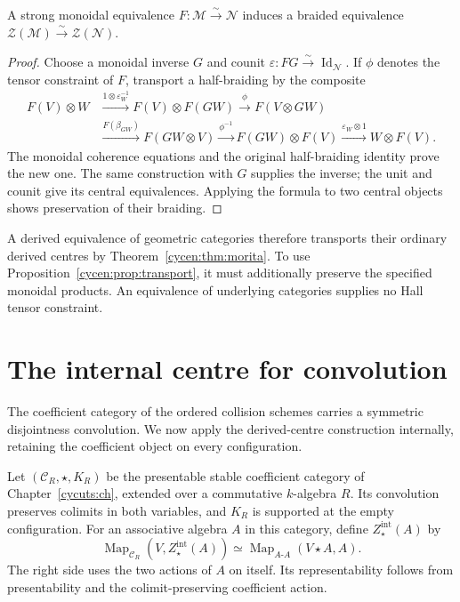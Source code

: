 \begin{proposition}\label{cycen:prop:transport}
A strong monoidal equivalence
$F:\mathscr M\xrightarrow{\sim}\mathscr N$ induces a
braided equivalence
$\mathcal Z(\mathscr M)\xrightarrow{\sim}\mathcal Z(\mathscr N)$.
\end{proposition}
\begin{proof}
Choose a monoidal inverse $G$ and counit
$\varepsilon:FG\xrightarrow{\sim}\operatorname{Id}_{\mathscr N}$.
If $\phi$ denotes the tensor constraint of $F$, transport a
half-braiding by the composite
\[
 \begin{split}
 F(V)\otimes W&\xrightarrow{1\otimes\varepsilon_W^{-1}}
 F(V)\otimes F(GW)\xrightarrow{\phi}F(V\otimes GW)\\
 &\xrightarrow{F(\beta_{GW})}F(GW\otimes V)
 \xrightarrow{\phi^{-1}}F(GW)\otimes F(V)
 \xrightarrow{\varepsilon_W\otimes1}W\otimes F(V).
 \end{split}
\]
The monoidal coherence equations and the original
half-braiding identity prove the new one. The same construction
with $G$ supplies the inverse; the unit and counit give its
central equivalences. Applying the formula to two central
objects shows preservation of their braiding.
\end{proof}

A derived equivalence of geometric categories therefore
transports their ordinary derived centres by
Theorem~\ref{cycen:thm:morita}. To use
Proposition~\ref{cycen:prop:transport}, it must additionally
preserve the specified monoidal products. An equivalence of
underlying categories supplies no Hall tensor constraint.

\section{The internal centre for convolution}
\label{cycen:sec:convolution}

The coefficient category of the ordered collision schemes
carries a symmetric disjointness convolution. We now apply
the derived-centre construction internally, retaining the
coefficient object on every configuration.

Let $(\mathscr C_R,\star,K_R)$ be the presentable stable
coefficient category of Chapter~\ref{cycuts:ch}, extended
over a commutative $k$-algebra $R$. Its convolution preserves
colimits in both variables, and $K_R$ is supported at the
empty configuration. For an associative algebra $A$ in this
category, define $Z_\star^{\mathrm{int}}(A)$ by
\begin{equation}\label{cycen:eq:internal-centre}
 \operatorname{Map}_{\mathscr C_R}
       (V,Z_\star^{\mathrm{int}}(A))
 \simeq
 \operatorname{Map}_{A\text{-}A}(V\star A,A).
\end{equation}
The right side uses the two actions of $A$ on itself. Its
representability follows from presentability and the
colimit-preserving coefficient action.


